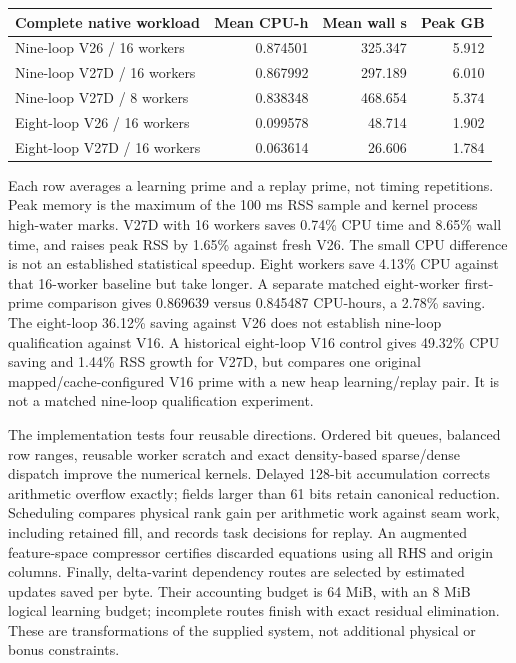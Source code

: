 \documentclass[11pt]{article}
\begin{document}
\begin{center}
\begin{tabular}{lrrr}\toprule
Complete native workload & Mean CPU-h & Mean wall s & Peak GB\\\midrule
Nine-loop V26 / 16 workers & 0.874501 & 325.347 & 5.912\\
Nine-loop V27D / 16 workers & 0.867992 & 297.189 & 6.010\\
Nine-loop V27D / 8 workers & 0.838348 & 468.654 & 5.374\\
Eight-loop V26 / 16 workers & 0.099578 & 48.714 & 1.902\\
Eight-loop V27D / 16 workers & 0.063614 & 26.606 & 1.784\\
\bottomrule
\end{tabular}
\end{center}
Each row averages a learning prime and a replay prime, not timing
repetitions. Peak memory is the maximum of the 100 ms RSS sample and kernel
process high-water marks. V27D with 16 workers saves 0.74\% CPU time and
8.65\% wall time, and raises peak RSS by 1.65\% against fresh V26. The small
CPU difference is not an established statistical speedup. Eight workers save 4.13\% CPU
against that 16-worker baseline but take longer. A separate matched
eight-worker first-prime comparison gives 0.869639 versus 0.845487 CPU-hours,
a 2.78\% saving. The eight-loop 36.12\% saving against V26 does not establish
nine-loop qualification against V16. A historical eight-loop V16 control
gives 49.32\% CPU saving and 1.44\% RSS growth for V27D, but compares one
original mapped/cache-configured V16 prime with a new heap learning/replay
pair. It is not a matched nine-loop qualification experiment.

The implementation tests four reusable directions. Ordered bit queues,
balanced row ranges, reusable worker scratch and exact density-based
sparse/dense dispatch improve the numerical kernels. Delayed 128-bit
accumulation corrects arithmetic overflow exactly; fields larger than
61 bits retain canonical reduction. Scheduling compares physical rank
gain per arithmetic work against seam work, including retained fill, and
records task decisions for replay. An augmented feature-space compressor
certifies discarded equations using all RHS and origin columns. Finally,
delta-varint dependency routes are selected by estimated updates saved per
byte. Their accounting budget is 64 MiB, with an 8 MiB logical learning
budget; incomplete routes finish with exact residual elimination. These
are transformations of the supplied system, not additional physical or
bonus constraints.
\end{document}
